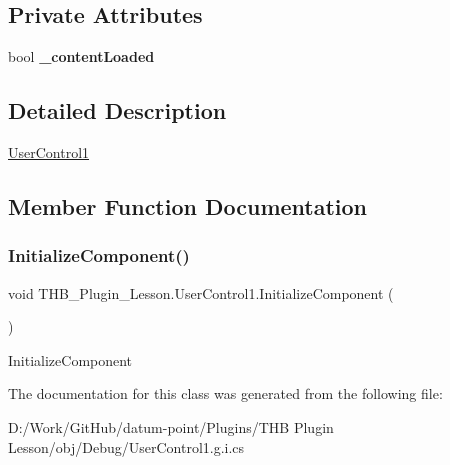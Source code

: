 \subsection*{Private Attributes}
\begin{DoxyCompactItemize}
\item 
\mbox{\label{class_t_h_b___plugin___lesson_1_1_user_control1_ad58ace768113ee37aa177bfbf97bf7cf}} 
bool {\bfseries \+\_\+content\+Loaded}
\end{DoxyCompactItemize}


\subsection{Detailed Description}
\mbox{\hyperlink{class_t_h_b___plugin___lesson_1_1_user_control1}{User\+Control1}} 



\subsection{Member Function Documentation}
\mbox{\label{class_t_h_b___plugin___lesson_1_1_user_control1_a6b157c1dad624766c5da2c984c9b1368}} 
\subsubsection{\texorpdfstring{Initialize\+Component()}{InitializeComponent()}}
{\footnotesize\ttfamily void T\+H\+B\+\_\+\+Plugin\+\_\+\+Lesson.\+User\+Control1.\+Initialize\+Component (\begin{DoxyParamCaption}{ }\end{DoxyParamCaption})}



Initialize\+Component 



The documentation for this class was generated from the following file\+:\begin{DoxyCompactItemize}
\item 
D\+:/\+Work/\+Git\+Hub/datum-\/point/\+Plugins/\+T\+H\+B Plugin Lesson/obj/\+Debug/User\+Control1.\+g.\+i.\+cs\end{DoxyCompactItemize}
